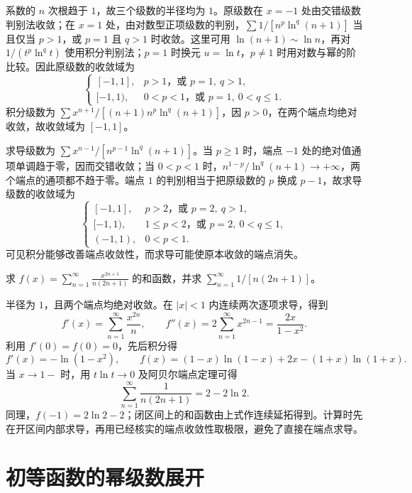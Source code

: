 \documentclass[UTF8,12pt,a4paper,fontset=fandol]{ctexbook}
\begin{document}
\begin{solve}
系数的 $n$ 次根趋于 $1$，故三个级数的半径均为 $1$。原级数在 $x=-1$ 处由交错级数判别法收敛；在 $x=1$ 处，由对数型正项级数的判别，$\sum1/[n^p\ln^q(n+1)]$ 当且仅当 $p>1$，或 $p=1$ 且 $q>1$ 时收敛。这里可用 $\ln(n+1)\sim\ln n$，再对 $1/(t^p\ln^qt)$ 使用积分判别法；$p=1$ 时换元 $u=\ln t$，$p\neq1$ 时用对数与幂的阶比较。因此原级数的收敛域为
\[
    \begin{cases}
        [-1,1],&p>1\text{，或 }p=1,\ q>1,\\
        [-1,1),&0<p<1\text{，或 }p=1,\ 0<q\leq1.
    \end{cases}
\]
积分级数为 $\sum x^{n+1}/[(n+1)n^p\ln^q(n+1)]$，因 $p>0$，在两个端点均绝对收敛，故收敛域为 $[-1,1]$。

求导级数为 $\sum x^{n-1}/[n^{p-1}\ln^q(n+1)]$。当 $p\geq1$ 时，端点 $-1$ 处的绝对值通项单调趋于零，因而交错收敛；当 $0<p<1$ 时，$n^{1-p}/\ln^q(n+1)\to+\infty$，两个端点的通项都不趋于零。端点 $1$ 的判别相当于把原级数的 $p$ 换成 $p-1$，故求导级数的收敛域为
\[
    \begin{cases}
        [-1,1],&p>2\text{，或 }p=2,\ q>1,\\
        [-1,1),&1\leq p<2\text{，或 }p=2,\ 0<q\leq1,\\
        (-1,1),&0<p<1.
    \end{cases}
\]
可见积分能够改善端点收敛性，而求导可能使原本收敛的端点消失。
\end{solve}

\begin{example}
\label{ex:power-series-summation-by-two-derivatives}
求 $\displaystyle f(x)=\sum_{n=1}^\infty\frac{x^{2n+1}}{n(2n+1)}$ 的和函数，并求 $\displaystyle\sum_{n=1}^\infty1/[n(2n+1)]$。
\end{example}

\begin{solve}
半径为 $1$，且两个端点均绝对收敛。在 $|x|<1$ 内连续两次逐项求导，得到
\[
    f'(x)=\sum_{n=1}^\infty\frac{x^{2n}}n,
    \qquad f''(x)=2\sum_{n=1}^\infty x^{2n-1}
       =\frac{2x}{1-x^2}.
\]
利用 $f'(0)=f(0)=0$，先后积分得
\[
    f'(x)=-\ln(1-x^2),\qquad
    f(x)=(1-x)\ln(1-x)+2x-(1+x)\ln(1+x).
\]
当 $x\to1-$ 时，用 $t\ln t\to0$ 及阿贝尔端点定理可得
\[
    \sum_{n=1}^\infty\frac1{n(2n+1)}=2-2\ln2.
\]
同理，$f(-1)=2\ln2-2$；闭区间上的和函数由上式作连续延拓得到。计算时先在开区间内部求导，再用已经核实的端点收敛性取极限，避免了直接在端点求导。
\end{solve}

\section{初等函数的幂级数展开}
\label{sec:power-series-expansions-of-elementary-functions}
\end{document}

